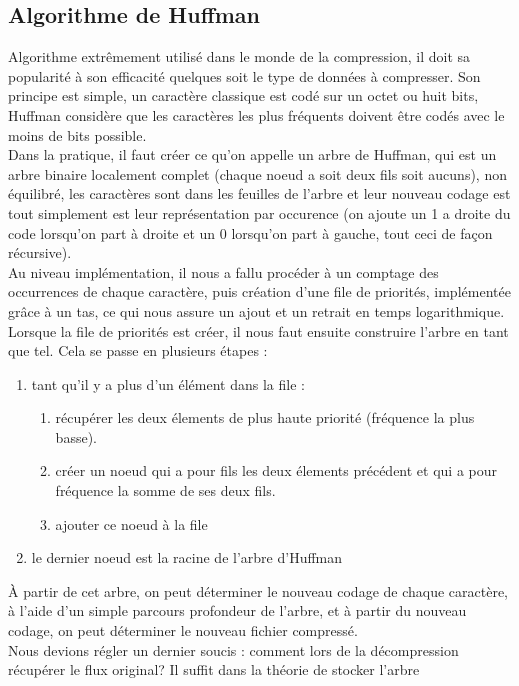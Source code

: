 \documentclass[a4paper,12pt]{article}
\begin{document}
	\subsection{Algorithme de Huffman}
Algorithme extrêmement utilisé dans le monde de la compression,  il doit
sa popularité à  son  efficacité  quelques  soit  le  type  de données à
compresser.  Son principe  est simple,  un caractère  classique est codé
sur un octet ou huit bits, Huffman considère que les caractères les plus
fréquents doivent être codés avec le moins de bits possible.\\
Dans la pratique, il faut créer ce qu'on appelle un arbre de Huffman,
qui est un arbre binaire localement complet (chaque noeud a soit deux
fils soit aucuns), non équilibré, les caractères sont dans les feuilles
de l'arbre et leur nouveau codage est tout simplement est leur
représentation par occurence (on ajoute un 1 a droite du code lorsqu'on
part à droite et un 0 lorsqu'on part à gauche, tout ceci de façon
récursive).\\
Au niveau implémentation, il nous a fallu procéder à un comptage des
occurrences de chaque caractère, puis création d'une file de priorités,
implémentée grâce à un tas, ce qui nous assure un ajout et un retrait en
temps logarithmique. Lorsque la file de priorités est créer, il nous
faut ensuite construire l'arbre en tant que tel. Cela se passe en
plusieurs étapes :
\begin{enumerate}
\item tant qu'il y a plus d'un élément dans la file :
\begin{enumerate}
\item récupérer les deux élements de plus haute priorité (fréquence la
plus basse).
\item créer un noeud qui a pour fils les deux élements précédent et qui
a pour fréquence la somme de ses deux fils.
\item ajouter ce noeud à la file
\end{enumerate}
\item le dernier noeud est la racine de l'arbre d'Huffman
\end{enumerate}
À partir de cet arbre, on peut déterminer le nouveau codage de chaque
caractère, à l'aide d'un simple parcours profondeur de l'arbre, et à
partir du nouveau codage, on peut déterminer le nouveau fichier
compressé.\\
Nous devions régler un dernier soucis : comment lors de la décompression
récupérer le flux original? Il suffit dans la théorie de stocker l'arbre
\end{document}
